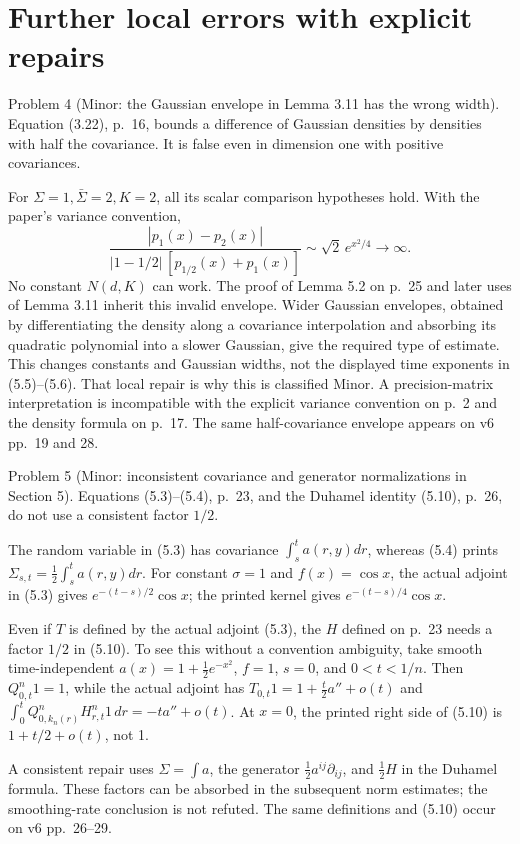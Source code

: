 \documentclass[10pt]{article}
\begin{document}
\section*{Further local errors with explicit repairs}
Problem 4 (Minor: the Gaussian envelope in Lemma 3.11 has the wrong width).  Equation (3.22), p. 16, bounds a difference of Gaussian densities by densities with half the covariance. It is false even in dimension one with positive covariances.\par
For \(\Sigma=1,\bar\Sigma=2,K=2\), all its scalar comparison hypotheses hold. With the paper’s variance convention, \[\frac{|p_1(x)-p_2(x)|}{|1-1/2|\,[p_{1/2}(x)+p_1(x)]}
\sim \sqrt2\,e^{x^2/4}\longrightarrow\infty.\] No constant \(N(d,K)\) can work. The proof of Lemma 5.2 on p. 25 and later uses of Lemma 3.11 inherit this invalid envelope. Wider Gaussian envelopes, obtained by differentiating the density along a covariance interpolation and absorbing its quadratic polynomial into a slower Gaussian, give the required type of estimate. This changes constants and Gaussian widths, not the displayed time exponents in (5.5)–(5.6). That local repair is why this is classified Minor. A precision-matrix interpretation is incompatible with the explicit variance convention on p. 2 and the density formula on p. 17. The same half-covariance envelope appears on v6 pp. 19 and 28.\par
Problem 5 (Minor: inconsistent covariance and generator normalizations in Section 5).  Equations (5.3)–(5.4), p. 23, and the Duhamel identity (5.10), p. 26, do not use a consistent factor \(1/2\).\par
The random variable in (5.3) has covariance \(\int_s^t a(r,y)dr\), whereas (5.4) prints \(\Sigma_{s,t}=\frac12\int_s^t a(r,y)dr\). For constant \(\sigma=1\) and \(f(x)=\cos x\), the actual adjoint in (5.3) gives \(e^{-(t-s)/2}\cos x\); the printed kernel gives \(e^{-(t-s)/4}\cos x\).\par
Even if \(T\) is defined by the actual adjoint (5.3), the \(H\) defined on p. 23 needs a factor \(1/2\) in (5.10). To see this without a convention ambiguity, take smooth time-independent \(a(x)=1+\frac12e^{-x^2}\), \(f=1\), \(s=0\), and \(0<t<1/n\). Then \(Q_{0,t}^n1=1\), while the actual adjoint has \(T_{0,t}1=1+\frac t2a''+o(t)\) and \(\int_0^tQ_{0,k_n(r)}^nH_{r,t}^n1\,dr=-ta''+o(t)\). At \(x=0\), the printed right side of (5.10) is \(1+t/2+o(t)\), not 1.\par
A consistent repair uses \(\Sigma=\int a\), the generator \(\frac12a^{ij}\partial_{ij}\), and \(\frac12H\) in the Duhamel formula. These factors can be absorbed in the subsequent norm estimates; the smoothing-rate conclusion is not refuted. The same definitions and (5.10) occur on v6 pp. 26–29.\par
\end{document}
